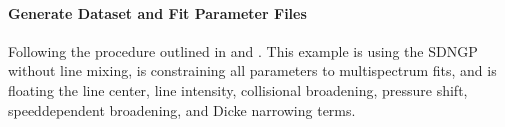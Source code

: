 \documentclass[letterpaper,10pt,english]{sphinxmanual}
\begin{document}
\paragraph{Generate Dataset and Fit Parameter Files}
\label{\detokenize{Applying Analytical Correction to hardness of collisions for HTP:generate-dataset-and-fit-parameter-files}}
\sphinxAtStartPar
Following the procedure outlined in {\hyperref[\detokenize{Fitting Synthetic Spectra:fitting-synthetic-spectra}]{}} and {\hyperref[\detokenize{Fitting Experimental Spectra:fitting-experimental-spectra}]{}}.  This example is using the SDNGP without line mixing, is constraining all parameters to multi\sphinxhyphen{}spectrum fits, and is floating the line center, line intensity, collisional broadening, pressure shift, speed\sphinxhyphen{}dependent broadening, and Dicke narrowing terms.
\end{document}
